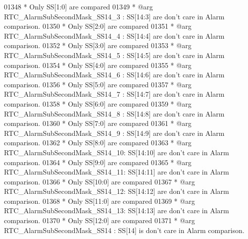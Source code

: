 \begin{DoxyCode}
01348 \textcolor{comment}{  *                                          Only SS[1:0] are compared}
01349 \textcolor{comment}{  *     @arg RTC\_AlarmSubSecondMask\_SS14\_3 : SS[14:3] are don't care in Alarm comparison.}
01350 \textcolor{comment}{  *                                          Only SS[2:0] are compared}
01351 \textcolor{comment}{  *     @arg RTC\_AlarmSubSecondMask\_SS14\_4 : SS[14:4] are don't care in Alarm comparison.}
01352 \textcolor{comment}{  *                                          Only SS[3:0] are compared}
01353 \textcolor{comment}{  *     @arg RTC\_AlarmSubSecondMask\_SS14\_5 : SS[14:5] are don't care in Alarm comparison.}
01354 \textcolor{comment}{  *                                          Only SS[4:0] are compared}
01355 \textcolor{comment}{  *     @arg RTC\_AlarmSubSecondMask\_SS14\_6 : SS[14:6] are don't care in Alarm comparison.}
01356 \textcolor{comment}{  *                                          Only SS[5:0] are compared}
01357 \textcolor{comment}{  *     @arg RTC\_AlarmSubSecondMask\_SS14\_7 : SS[14:7] are don't care in Alarm comparison.}
01358 \textcolor{comment}{  *                                          Only SS[6:0] are compared}
01359 \textcolor{comment}{  *     @arg RTC\_AlarmSubSecondMask\_SS14\_8 : SS[14:8] are don't care in Alarm comparison.}
01360 \textcolor{comment}{  *                                          Only SS[7:0] are compared}
01361 \textcolor{comment}{  *     @arg RTC\_AlarmSubSecondMask\_SS14\_9 : SS[14:9] are don't care in Alarm comparison.}
01362 \textcolor{comment}{  *                                          Only SS[8:0] are compared}
01363 \textcolor{comment}{  *     @arg RTC\_AlarmSubSecondMask\_SS14\_10: SS[14:10] are don't care in Alarm comparison.}
01364 \textcolor{comment}{  *                                          Only SS[9:0] are compared}
01365 \textcolor{comment}{  *     @arg RTC\_AlarmSubSecondMask\_SS14\_11: SS[14:11] are don't care in Alarm comparison.}
01366 \textcolor{comment}{  *                                          Only SS[10:0] are compared}
01367 \textcolor{comment}{  *     @arg RTC\_AlarmSubSecondMask\_SS14\_12: SS[14:12] are don't care in Alarm comparison.}
01368 \textcolor{comment}{  *                                          Only SS[11:0] are compared}
01369 \textcolor{comment}{  *     @arg RTC\_AlarmSubSecondMask\_SS14\_13: SS[14:13] are don't care in Alarm comparison.}
01370 \textcolor{comment}{  *                                          Only SS[12:0] are compared}
01371 \textcolor{comment}{  *     @arg RTC\_AlarmSubSecondMask\_SS14   : SS[14] is don't care in Alarm comparison.}

\end{DoxyCode}
